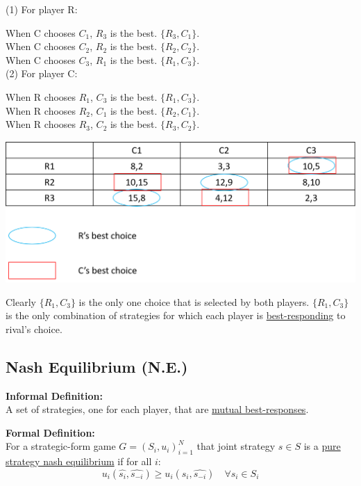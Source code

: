 \documentclass[12pt]{article}
\newcommand{\bb}[1]{{\textbf {#1}}}
\newcommand{\uu}[1]{\underline{#1}}
\newcommand{\e}[1]{$ #1 $}
\newcommand{\ee}[1]{$$ #1 $$}
\begin{document}
\begin{spacing}{1.5}
            (1) For player R:

            When C chooses \e{C_1}, \e{R_3} is the best. \e{ \{ R_3, C_1 \}}.\\
            When C chooses \e{C_2}, \e{R_2} is the best. \e{ \{ R_2, C_2 \}}.\\
            When C chooses \e{C_3}, \e{R_1} is the best. \e{ \{ R_1, C_3 \}}.\\

            (2) For player C:

            When R chooses \e{R_1}, \e{C_3} is the best. \e{ \{ R_1, C_3 \}}.\\
            When R chooses \e{R_2}, \e{C_1} is the best. \e{ \{ R_2, C_1 \}}.\\
            When R chooses \e{R_3}, \e{C_2} is the best. \e{ \{ R_3, C_2 \}}.\\

            \begin{center}
                \includegraphics[scale = .5]{pic/lecture3/BR_circled.png}
            \end{center}

            Clearly \e{ \{R_1, C_3 \}} is the only one choice that is selected by both players.
            \e{ \{R_1, C_3 \}} is the only combination of strategies for which each player 
            is \uu{best-responding} to rival's choice.

        \subsection{Nash Equilibrium (N.E.)}

            \bb{Informal Definition:}\\
            A set of strategies, one for each player, that are \uu{mutual best-responses}.

            \bb{Formal Definition:}\\
            For a strategic-form game \e{G = (S_i, u_i)_{i = 1}^N} that joint strategy
            \e{\hat{s} \in S} is a \uu{pure strategy nash equilibrium} if for all \e{i}:
            \ee{u_i(\hat{s_i}, \hat{s_{-i}}) \ge u_i(s_i, \hat{s_{-i}}) \quad \forall s_i \in S_i} 


\end{spacing}
\end{document}
